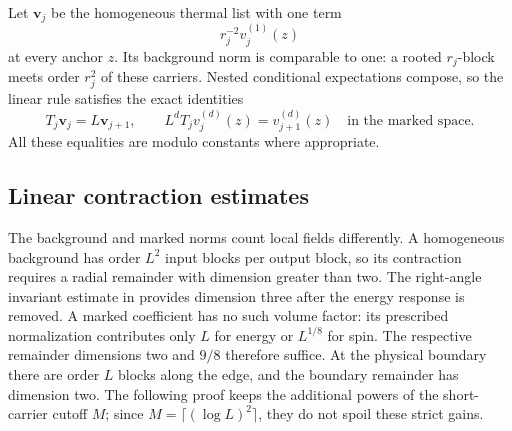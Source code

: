 Let $\boldsymbol v_j$ be the homogeneous thermal list with one term
\begin{equation}
 r_j^{-2}v_j^{(1)}(z)
 \label{rg:thermal-list}
\end{equation}
at every anchor $z$.  Its background norm is comparable to one: a rooted
$r_j$-block meets order $r_j^2$ of these carriers.  Nested conditional
expectations compose, so the linear rule satisfies the exact identities
\begin{equation}
 T_j\boldsymbol v_j=L\boldsymbol v_{j+1},\qquad
 L^dT_jv_j^{(d)}(z)=v_{j+1}^{(d)}(z)
 \quad\text{in the marked space}.
 \label{rg:line-transport}
\end{equation}
All these equalities are modulo constants where appropriate.

\subsection{Linear contraction estimates}

The background and marked norms count local fields differently.  A
homogeneous background has order $L^2$ input blocks per output block,
so its contraction requires a radial remainder with dimension greater
than two.  The right-angle invariant estimate in 
provides dimension three after the energy response is removed.  A
marked coefficient has no such volume factor: its prescribed
normalization contributes only $L$ for energy or $L^{1/8}$ for spin.
The respective remainder dimensions two and $9/8$ therefore suffice.
At the physical boundary there are order $L$ blocks along the edge,
and the boundary remainder has dimension two.  The following proof
keeps the additional powers of the short-carrier cutoff $M$; since
$M=\lceil(\log L)^2\rceil$, they do not spoil these strict gains.

